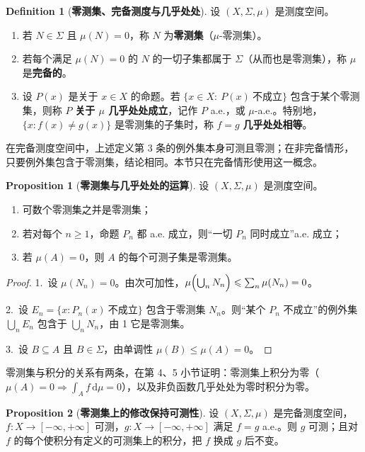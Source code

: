 \documentclass[oneside]{book}
\theoremstyle{definition}
\newcommand{\dd}{\mathrm{d}}
\theoremstyle{definition}
\newtheorem{proposition}{Proposition}[section]
\newtheorem{definition}{Definition}[section]
\begin{document}
	\begin{definition}[\bfseries{零测集、完备测度与几乎处处}]
		设 $(X,\Sigma,\mu)$ 是测度空间。
		\begin{enumerate}
			\item 若 $N\in\Sigma$ 且 $\mu(N)=0$，称 $N$ 为\textbf{零测集}（$\mu$-零测集）。
			\item 若每个满足 $\mu(N)=0$ 的 $N$ 的一切子集都属于 $\Sigma$（从而也是零测集），称 $\mu$ 是\textbf{完备的}。
			\item 设 $P(x)$ 是关于 $x\in X$ 的命题。若 $\{x\in X:\ P(x)\ \text{不成立}\}$ 包含于某个零测集，则称 $P$ \textbf{关于 $\mu$ 几乎处处成立}，记作 $P$ a.e.，或 $\mu$-a.e.。特别地，$\{x:f(x)\neq g(x)\}$ 是零测集的子集时，称 $f=g$ \textbf{几乎处处相等}。
		\end{enumerate}
	\end{definition}
	
	在完备测度空间中，上述定义第 3 条的例外集本身可测且零测；在非完备情形，只要例外集包含于零测集，结论相同。本节只在完备情形使用这一概念。
	
	\begin{proposition}[\bfseries{零测集与几乎处处的运算}]
		设 $(X,\Sigma,\mu)$ 是测度空间。
		\begin{enumerate}
			\item 可数个零测集之并是零测集；
			\item 若对每个 $n\geqslant1$，命题 $P_n$ 都 a.e. 成立，则“一切 $P_n$ 同时成立”a.e. 成立；
			\item 若 $\mu(A)=0$，则 $A$ 的每个可测子集是零测集。
		\end{enumerate}
	\end{proposition}
	
	\begin{proof}
		1.\ 设 $\mu(N_n)=0$。由次可加性，$\mu\Bigl(\bigcup_n N_n\Bigr)\leqslant\sum_n\mu(N_n)=0$。
		
		2.\ 设 $E_n=\{x:P_n(x)\ \text{不成立}\}$ 包含于零测集 $N_n$。则“某个 $P_n$ 不成立”的例外集 $\bigcup_n E_n$ 包含于 $\bigcup_n N_n$，由 1 它是零测集。
		
		3.\ 设 $B\subseteq A$ 且 $B\in\Sigma$，由单调性 $\mu(B)\leqslant\mu(A)=0$。
	\end{proof}
	
	零测集与积分的关系有两条，在第 4、5 小节证明：零测集上积分为零（$\mu(A)=0\Rightarrow\int_A f\,\dd\mu=0$），以及非负函数几乎处处为零时积分为零。
	
	\begin{proposition}[\bfseries{零测集上的修改保持可测性}]
		设 $(X,\Sigma,\mu)$ 是完备测度空间，$f:X\to[-\infty,+\infty]$ 可测，$g:X\to[-\infty,+\infty]$ 满足 $f=g$ a.e.。则 $g$ 可测；且对 $f$ 的每个使积分有定义的可测集上的积分，把 $f$ 换成 $g$ 后不变。
	\end{proposition}
	
\end{document}
